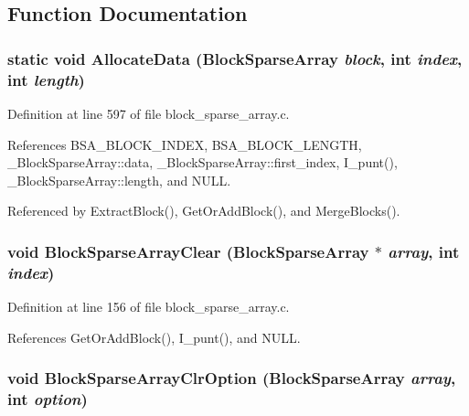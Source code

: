\subsection{Function Documentation}
\subsubsection{\setlength{\rightskip}{0pt plus 5cm}static void Allocate\-Data (\bf{Block\-Sparse\-Array} {\em block}, int {\em index}, int {\em length})\hspace{0.3cm}{\tt  [static]}}\label{block__sparse__array_8c_e39caf7cb864a4002117f1ad0af68dd5}




Definition at line 597 of file block\_\-sparse\_\-array.c.

References BSA\_\-BLOCK\_\-INDEX, BSA\_\-BLOCK\_\-LENGTH, \_\-Block\-Sparse\-Array::data, \_\-Block\-Sparse\-Array::first\_\-index, I\_\-punt(), \_\-Block\-Sparse\-Array::length, and NULL.

Referenced by Extract\-Block(), Get\-Or\-Add\-Block(), and Merge\-Blocks().
\subsubsection{\setlength{\rightskip}{0pt plus 5cm}void Block\-Sparse\-Array\-Clear (\bf{Block\-Sparse\-Array} $\ast$ {\em array}, int {\em index})}\label{block__sparse__array_8c_addb19ecae936e51d15d2054eeffdbe1}




Definition at line 156 of file block\_\-sparse\_\-array.c.

References Get\-Or\-Add\-Block(), I\_\-punt(), and NULL.
\subsubsection{\setlength{\rightskip}{0pt plus 5cm}void Block\-Sparse\-Array\-Clr\-Option (\bf{Block\-Sparse\-Array} {\em array}, int {\em option})}\label{block__sparse__array_8c_c0a4eb2f032ed20389a564bf174c98fe}




